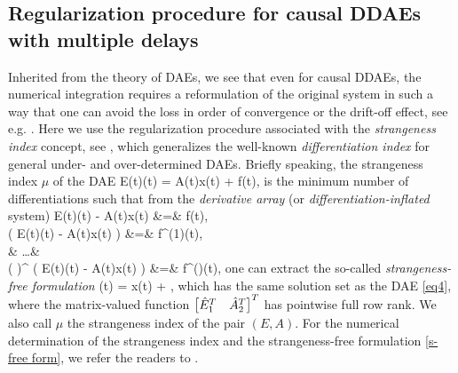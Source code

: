 \documentclass[final,reqno]{siamltex}
\begin{document}
\subsection{Regularization procedure for causal DDAEs with multiple delays}\label{Sec2.1}
Inherited from the theory of DAEs, we see that even for causal DDAEs, the numerical integration requires a reformulation of the original system in such a way that one can 
avoid the loss in order of convergence or the drift-off effect, see e.g. \cite{BreCP96,KunM06}. Here we use the regularization procedure 
associated with the \emph{strangeness index} concept, see \cite{KunM06}, which generalizes the well-known \emph{differentiation index} \cite{BreCP96} for general 
under- and over-determined DAEs. Briefly speaking, the strangeness index $\mu$ of the DAE 
%
\be\label{eq4}
 E(t)(t) = A(t)x(t) + f(t), 
\ee
%
is the minimum number of differentiations such that from the \emph{derivative array} (or \emph{differentiation-inflated} system)
%
\bens
 E(t)(t) - A(t)x(t)  &=& f(t), \\
 \ddt \left( E(t)(t) - A(t)x(t) \right) &=& f^{(1)}(t), \\
 & \dots & \\
 \left( \ddt \right)^{\mu} \left( E(t)(t) - A(t)x(t) \right) &=& f^{(\mu)}(t),
\eens
%
one can extract the so-called \emph{strangeness-free formulation}
%
\be\label{s-free form}
  (t) =  x(t) + ,
\ee
%
which has the same solution set as the DAE \eqref{eq4}, where the matrix-valued function $\begin{bmatrix} \hat{E}^T_1 & \hat{A}^T_2 \end{bmatrix}^T$ has pointwise full row rank.
We also call $\mu$ the strangeness index of the pair $(E,A)$. 
For the numerical determination of the strangeness index and the strangeness-free formulation \eqref{s-free form}, we refer the readers to 
\cite{KunMRW97,KunMS05}.
\end{document}
